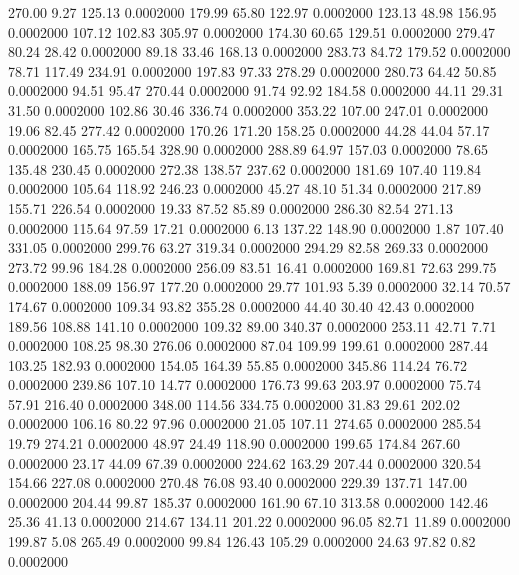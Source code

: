  270.00    9.27  125.13   0.0002000
 179.99   65.80  122.97   0.0002000
 123.13   48.98  156.95   0.0002000
 107.12  102.83  305.97   0.0002000
 174.30   60.65  129.51   0.0002000
 279.47   80.24   28.42   0.0002000
  89.18   33.46  168.13   0.0002000
 283.73   84.72  179.52   0.0002000
  78.71  117.49  234.91   0.0002000
 197.83   97.33  278.29   0.0002000
 280.73   64.42   50.85   0.0002000
  94.51   95.47  270.44   0.0002000
  91.74   92.92  184.58   0.0002000
  44.11   29.31   31.50   0.0002000
 102.86   30.46  336.74   0.0002000
 353.22  107.00  247.01   0.0002000
  19.06   82.45  277.42   0.0002000
 170.26  171.20  158.25   0.0002000
  44.28   44.04   57.17   0.0002000
 165.75  165.54  328.90   0.0002000
 288.89   64.97  157.03   0.0002000
  78.65  135.48  230.45   0.0002000
 272.38  138.57  237.62   0.0002000
 181.69  107.40  119.84   0.0002000
 105.64  118.92  246.23   0.0002000
  45.27   48.10   51.34   0.0002000
 217.89  155.71  226.54   0.0002000
  19.33   87.52   85.89   0.0002000
 286.30   82.54  271.13   0.0002000
 115.64   97.59   17.21   0.0002000
   6.13  137.22  148.90   0.0002000
   1.87  107.40  331.05   0.0002000
 299.76   63.27  319.34   0.0002000
 294.29   82.58  269.33   0.0002000
 273.72   99.96  184.28   0.0002000
 256.09   83.51   16.41   0.0002000
 169.81   72.63  299.75   0.0002000
 188.09  156.97  177.20   0.0002000
  29.77  101.93    5.39   0.0002000
  32.14   70.57  174.67   0.0002000
 109.34   93.82  355.28   0.0002000
  44.40   30.40   42.43   0.0002000
 189.56  108.88  141.10   0.0002000
 109.32   89.00  340.37   0.0002000
 253.11   42.71    7.71   0.0002000
 108.25   98.30  276.06   0.0002000
  87.04  109.99  199.61   0.0002000
 287.44  103.25  182.93   0.0002000
 154.05  164.39   55.85   0.0002000
 345.86  114.24   76.72   0.0002000
 239.86  107.10   14.77   0.0002000
 176.73   99.63  203.97   0.0002000
  75.74   57.91  216.40   0.0002000
 348.00  114.56  334.75   0.0002000
  31.83   29.61  202.02   0.0002000
 106.16   80.22   97.96   0.0002000
  21.05  107.11  274.65   0.0002000
 285.54   19.79  274.21   0.0002000
  48.97   24.49  118.90   0.0002000
 199.65  174.84  267.60   0.0002000
  23.17   44.09   67.39   0.0002000
 224.62  163.29  207.44   0.0002000
 320.54  154.66  227.08   0.0002000
 270.48   76.08   93.40   0.0002000
 229.39  137.71  147.00   0.0002000
 204.44   99.87  185.37   0.0002000
 161.90   67.10  313.58   0.0002000
 142.46   25.36   41.13   0.0002000
 214.67  134.11  201.22   0.0002000
  96.05   82.71   11.89   0.0002000
 199.87    5.08  265.49   0.0002000
  99.84  126.43  105.29   0.0002000
  24.63   97.82    0.82   0.0002000
